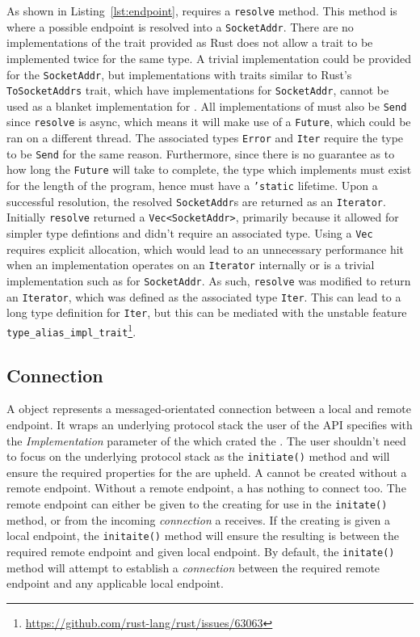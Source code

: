As shown in Listing~\ref{lst:endpoint}, \Endpoint{} requires a \texttt{resolve} method.
This method is where a possible endpoint is resolved into a \texttt{SocketAddr}.
There are no implementations of the trait provided as Rust does not allow a trait to be implemented twice for the same
type.
A trivial implementation could be provided for the \texttt{SocketAddr}, but implementations with traits similar to
Rust's \texttt{ToSocketAddrs} trait, which have implementations for \texttt{SocketAddr}, cannot be used as a blanket
implementation for \Endpoint{}.
All implementations of \Endpoint{} must also be \texttt{Send} since \texttt{resolve} is async, which means it will
make use of a \texttt{Future}, which could be ran on a different thread.
The associated types \texttt{Error} and \texttt{Iter} require the type to be \texttt{Send} for the same reason.
Furthermore, since there is no guarantee as to how long the \texttt{Future} will take to complete, the type which
implements \Endpoint{} must exist for the length of the program, hence must have a \texttt{'static} lifetime.
Upon a successful resolution, the resolved \texttt{SocketAddr}s are returned as an \texttt{Iterator}.
Initially \texttt{resolve} returned a \texttt{Vec<SocketAddr>}, primarily because it allowed for simpler type defintions
and didn't require an associated type.
Using a \texttt{Vec} requires explicit allocation, which would lead to an unnecessary performance hit when an
implementation operates on an \texttt{Iterator} internally or is a trivial implementation such as for
\texttt{SocketAddr}.
As such, \texttt{resolve} was modified to return an \texttt{Iterator}, which was defined as the associated type
\texttt{Iter}.
This can lead to a long type definition for \texttt{Iter}, but this can be mediated with the unstable feature
\texttt{type\_alias\_impl\_trait}\footnote{\url{https://github.com/rust-lang/rust/issues/63063}}.

\subsection{Connection}\label{subsec:connection}
A \connection{} object represents a messaged-orientated connection between a local and remote endpoint.
It wraps an underlying protocol stack the user of the API specifies with the \emph{Implementation}
parameter of the \preconnection{} which crated the \connection{}.
The user shouldn't need to focus on the underlying protocol stack as the \texttt{initiate()} method and
\listener{} will ensure the required properties for the \connection{} are upheld.
A \connection{} cannot be created without a remote endpoint.
Without a remote endpoint, a \connection{} has nothing to connect too.
The remote endpoint can either be given to the creating \preconnection{} for use in the \texttt{initate()} method,
or from the incoming \emph{connection} a \listener{} receives.
If the creating \preconnection{} is given a local endpoint, the \texttt{initaite()} method will ensure the resulting
\connection{} is between the required remote endpoint and given local endpoint.
By default, the \texttt{initate()} method will attempt to establish a \emph{connection} between the required remote
endpoint and any applicable local endpoint.

